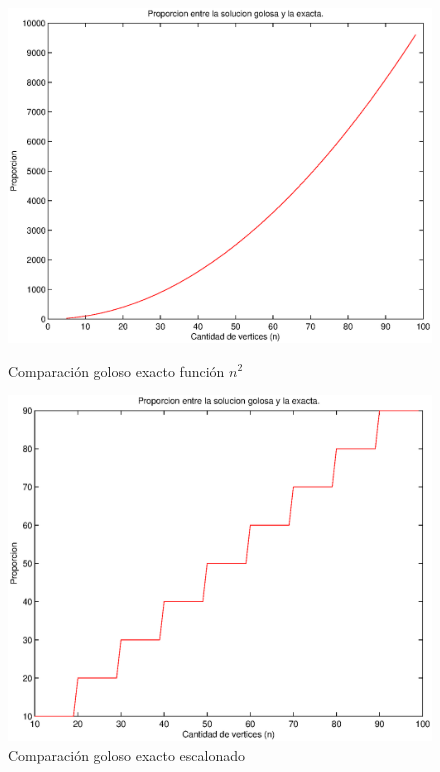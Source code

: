 \begin{figure}[H]
  \begin{minipage}{0.5\linewidth}
    \includegraphics[width=\linewidth]{graficos/goloso_proporcion.eps}
    \caption{Comparación goloso exacto función $n^2$}\label{fig:goloso-n2}
  \end{minipage}
  \hfill
  \begin{minipage}{0.5\linewidth}
    \includegraphics[width=\linewidth]{graficos/goloso_proporcion2.eps}
    \caption{Comparación goloso exacto escalonado}\label{fig:goloso-escalonado}
  \end{minipage}
\end{figure}

